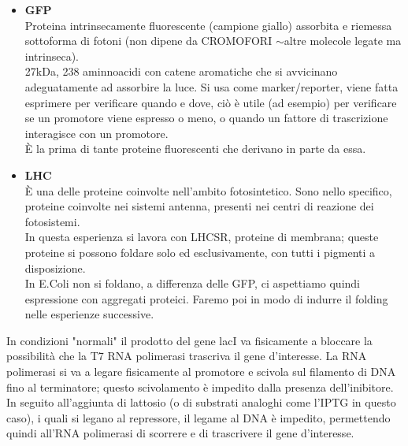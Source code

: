 \documentclass{extarticle}
\begin{document}
\begin{itemize}
    \item[] \Large{\textbf{GFP}}\\
    \normalsize Proteina intrinsecamente fluorescente (campione giallo) assorbita e riemessa sottoforma di fotoni (non dipene da CROMOFORI $\sim$altre molecole legate ma intrinseca).\\
    27kDa, 238 aminnoacidi con catene aromatiche che si avvicinano adeguatamente ad assorbire la luce. Si usa come marker/reporter,
    viene fatta esprimere per verificare quando e dove, ciò è utile (ad esempio) per verificare se un promotore viene espresso o meno, o quando un fattore di trascrizione 
    interagisce con un promotore.\\
    È la prima di tante proteine fluorescenti che derivano in parte da essa.
    \item[] \Large{\textbf{LHC}} \\
    \normalsize È una delle proteine coinvolte nell'ambito fotosintetico. Sono nello specifico, proteine coinvolte nei sistemi antenna, presenti nei centri di reazione dei fotosistemi.\\
    In questa esperienza si lavora con LHCSR, proteine di membrana; queste proteine si possono foldare solo ed esclusivamente, con tutti i pigmenti a disposizione.\\
    In E.Coli non si foldano, a differenza delle GFP, ci aspettiamo quindi espressione con aggregati proteici. Faremo poi in modo di indurre il folding nelle esperienze successive. 
\end{itemize}
In condizioni "normali" il prodotto del gene lacI va fisicamente a bloccare la possibilità che la T7 RNA polimerasi 
trascriva il gene d'interesse. La RNA polimerasi si va a legare fisicamente al promotore e scivola sul filamento di DNA 
fino al terminatore; questo scivolamento è impedito dalla presenza dell'inibitore. In seguito all'aggiunta di lattosio 
(o di substrati analoghi come l'IPTG in questo caso), i quali si legano al repressore, il legame al DNA è impedito, 
permettendo quindi all'RNA polimerasi di scorrere e di trascrivere il gene d'interesse.
\end{document}
